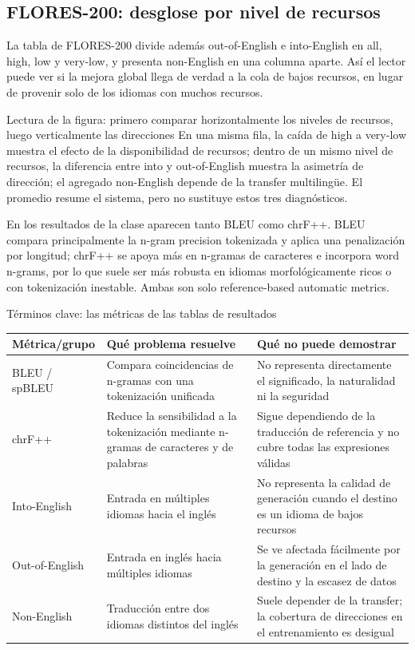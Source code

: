 \subsection{FLORES-200: desglose por nivel de recursos}

La tabla de FLORES-200 divide además out-of-English e into-English en all, high, low y very-low, y presenta non-English en una columna aparte. Así el lector puede ver si la mejora global llega de verdad a la cola de bajos recursos, en lugar de provenir solo de los idiomas con muchos recursos.


\begin{knowledgebox}{Lectura de la figura: primero comparar horizontalmente los niveles de recursos, luego verticalmente las direcciones}
En una misma fila, la caída de high a very-low muestra el efecto de la disponibilidad de recursos; dentro de un mismo nivel de recursos, la diferencia entre into y out-of-English muestra la asimetría de dirección; el agregado non-English depende de la transfer multilingüe. El promedio resume el sistema, pero no sustituye estos tres diagnósticos.
\end{knowledgebox}

En los resultados de la clase aparecen tanto BLEU como chrF++. BLEU compara principalmente la n-gram precision tokenizada y aplica una penalización por longitud; chrF++ se apoya más en n-gramas de caracteres e incorpora word n-grams, por lo que suele ser más robusta en idiomas morfológicamente ricos o con tokenización inestable. Ambas son solo reference-based automatic metrics.

\begin{knowledgebox}{Términos clave: las métricas de las tablas de resultados}
\begin{tabularx}{\textwidth}{@{}L{0.2\textwidth}L{0.27\textwidth}X@{}}
\toprule
Métrica/grupo & Qué problema resuelve & Qué no puede demostrar \\
\midrule
BLEU / spBLEU & Compara coincidencias de n-gramas con una tokenización unificada & No representa directamente el significado, la naturalidad ni la seguridad \\
chrF++ & Reduce la sensibilidad a la tokenización mediante n-gramas de caracteres y de palabras & Sigue dependiendo de la traducción de referencia y no cubre todas las expresiones válidas \\
Into-English & Entrada en múltiples idiomas hacia el inglés & No representa la calidad de generación cuando el destino es un idioma de bajos recursos \\
Out-of-English & Entrada en inglés hacia múltiples idiomas & Se ve afectada fácilmente por la generación en el lado de destino y la escasez de datos \\
Non-English & Traducción entre dos idiomas distintos del inglés & Suele depender de la transfer; la cobertura de direcciones en el entrenamiento es desigual \\
\bottomrule
\end{tabularx}
\end{knowledgebox}

